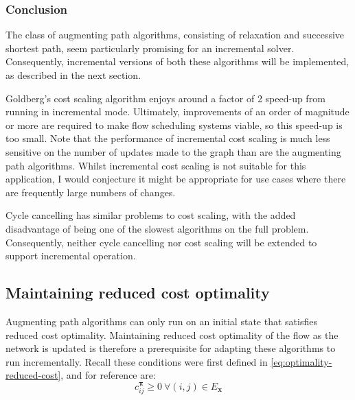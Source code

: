 \subsubsection{Conclusion}

The class of augmenting path algorithms, consisting of relaxation and successive shortest path, seem particularly promising for an incremental solver. Consequently, incremental versions of both these algorithms will be implemented, as described in the next section.

Goldberg's cost scaling algorithm enjoys around a factor of 2 speed-up from running in incremental mode. Ultimately, improvements of an order of magnitude or more are required to make flow scheduling systems viable, so this speed-up is too small. Note that the performance of incremental cost scaling is much less sensitive on the number of updates made to the graph than are the augmenting path algorithms\footnotemark. Whilst incremental cost scaling is not suitable for this application, I would conjecture it might be appropriate for use cases where there are frequently large numbers of changes. %

Cycle cancelling has similar problems to cost scaling, with the added disadvantage of being one of the slowest algorithms on the full problem. Consequently, neither cycle cancelling nor cost scaling will be extended to support incremental operation.

\subsection{Maintaining reduced cost optimality}

Augmenting path algorithms can only run on an initial state that satisfies reduced cost optimality. Maintaining reduced cost optimality of the flow as the network is updated is therefore a prerequisite for adapting these algorithms to run incrementally. Recall these conditions were first defined in \cref{eq:optimality-reduced-cost}, and for reference are:
\[c_{ij}^{\boldsymbol{\pi}}\geq0\:\forall(i,j)\in E_{\mathbf{x}}\]

